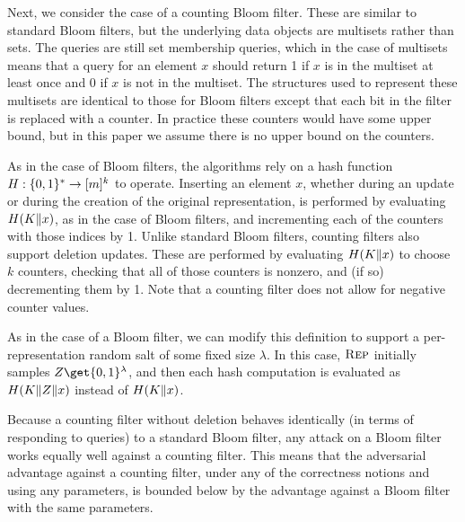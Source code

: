 Next, we consider the case of a counting Bloom filter. These are similar to
standard Bloom filters, but the underlying data objects are multisets rather
than sets. The queries are still set membership queries, which in the case of
multisets means that a query for an element $x$ should return 1 if $x$ is in the
multiset at least once and 0 if $x$ is not in the multiset. The structures used
to represent these multisets are identical to those for Bloom filters except
that each bit in the filter is replaced with a counter. In practice these
counters would have some upper bound, but in this paper we assume there is no
upper bound on the counters.

As in the case of Bloom filters, the algorithms rely on a hash function
$H: \{0,1\}^* \to [m]^k$ to operate. Inserting an element $x$, whether during an
update or during the creation of the original representation, is performed by
evaluating $H(K \Vert x)$, as in the case of Bloom filters, and incrementing
each of the counters with those indices by 1. Unlike standard Bloom filters,
counting filters also support deletion updates. These are performed by
evaluating $H(K \Vert x)$ to choose $k$ counters, checking that all of those
counters is nonzero, and (if so) decrementing them by 1. Note that a counting
filter does not allow for negative counter values.

As in the case of a Bloom filter, we can modify this definition to support a
per-representation random salt of some fixed size $\lambda$. In this case,
$\textsc{Rep}$ initially samples $\salt \get \bits^\lambda$, and then each hash
computation is evaluated as $H(K \Vert Z \Vert x)$ instead of
$H(K \Vert x)$.

Because a counting filter without deletion behaves identically (in terms of
responding to queries) to a standard Bloom filter, any attack on a Bloom filter
works equally well against a counting filter. This means that the adversarial
advantage against a counting filter, under any of the correctness notions and
using any parameters, is bounded below by the advantage against a Bloom filter
with the same parameters.

